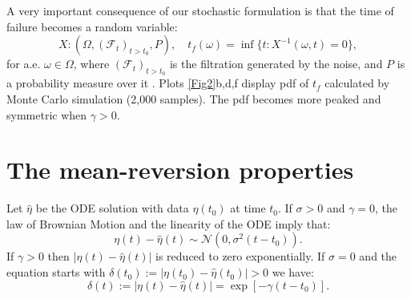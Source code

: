 \documentclass{article}
\begin{document}
A very important consequence of our stochastic formulation is that the time of failure becomes a random variable:
$$X:\left(\Omega, (\mathcal F_t)_{t>t_0}, P\right), \quad t_f(\omega)=\inf\{t: X^{-1}(\omega,t)=0\},$$
for a.e. $\omega\in\Omega$, where $(\mathcal F_t)_{t>t_0}$ is the filtration generated by the noise, and $P$ is a probability measure over it \citep{Karatzas1991}. Plots \ref{Fig2}b,d,f display pdf of $t_f$ calculated by Monte Carlo simulation (2,000 samples). The pdf becomes more peaked and symmetric when $\gamma>0$.

\section{The mean-reversion properties}\label{s3}
Let $\hat\eta$ be the ODE solution with data $\eta(t_0)$ at time $t_0$. If $\sigma>0$ and $\gamma=0$, the law of Brownian Motion and the linearity of the ODE imply that:
$$\eta(t)-\hat\eta(t)\sim \mathcal N\left(0,\sigma^2(t-t_0)\right).$$
If $\gamma>0$ then $\left|\eta(t)-\hat\eta(t)\right|$ is reduced to zero exponentially. If $\sigma=0$ and the equation starts with $\delta(t_0):=|\eta(t_0)-\hat\eta(t_0)|>0$ we have:
$$\delta(t):=\left|\eta(t)-\hat\eta(t)\right|=\exp[-\gamma(t-t_0)].$$
\end{document}
